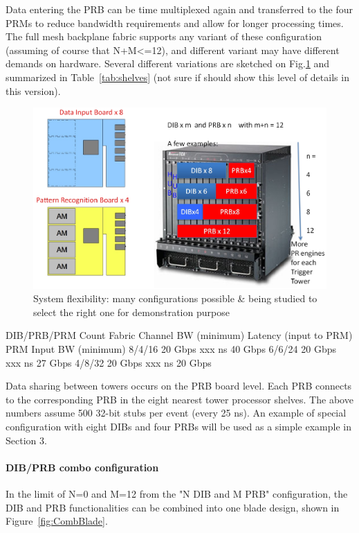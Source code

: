 \noindent Data entering the PRB can be time multiplexed again and transferred to the four PRMs to reduce bandwidth requirements and allow for longer processing times.  The full mesh backplane fabric supports any variant of these configuration (assuming of course that N+M<=12), and different variant may have different demands on hardware. Several different variations are sketched on Fig.\ref{fig:System_3} and summarized in Table~\ref{tab:shelves} (not sure if should show this level of details in this version).

\begin{figure}[ht!]
\centering
\includegraphics[width=0.7\columnwidth]{Plots/System_3.eps}
\caption{System flexibility: many configurations possible \& being studied to select the right one for demonstration purpose}
\label{fig:System_3}
\end{figure}

 




DIB/PRB/PRM Count	Fabric Channel BW (minimum)	Latency
(input to PRM)	PRM Input BW (minimum)
8/4/16	20 Gbps	xxx ns	40 Gbps
6/6/24	20 Gbps	xxx ns	27 Gbps
4/8/32	20 Gbps	xxx ns	20 Gbps

\noindent Data sharing between towers occurs on the PRB board level.  Each PRB connects to the corresponding PRB in the eight nearest tower processor shelves.  The above numbers assume 500 32-bit stubs per event (every 25 ns).  An example of special configuration with eight DIBs and four PRBs will be used as a simple example in Section 3.

\paragraph{DIB/PRB combo configuration}

\noindent In the limit of N=0 and M=12 from the "N DIB and M PRB" configuration, the DIB and PRB functionalities can be combined into one blade design, shown in Figure~\ref{fig:CombBlade}.

